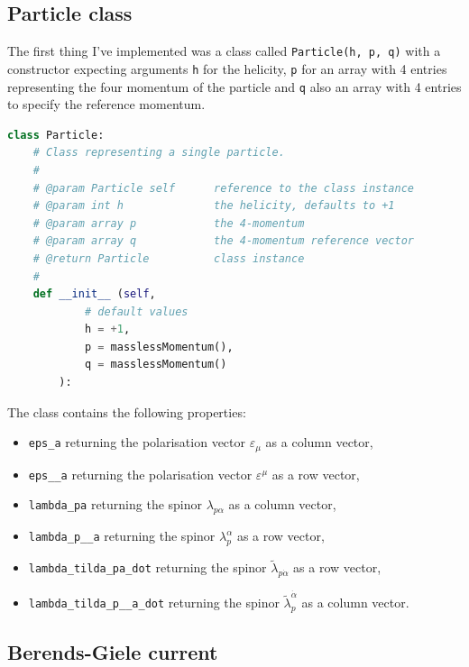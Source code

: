 \documentclass{article}
\theoremstyle{definition}
\def\code#1{\texttt{#1}}
\numberwithin{equation}{section}
\begin{document}
\subsection{Particle class}

The first thing I've implemented was a class called \code{Particle(h, p, q)} with a constructor expecting arguments \code{h} for the helicity, \code{p} for an array with 4 entries representing the four momentum of the particle and \code{q} also an array with 4 entries to specify the reference momentum.

\begin{lstlisting}[language=Python, caption=Particle class definiton]
class Particle:
    # Class representing a single particle.
    #
    # @param Particle self      reference to the class instance
    # @param int h              the helicity, defaults to +1
    # @param array p            the 4-momentum
    # @param array q            the 4-momentum reference vector
    # @return Particle          class instance
    #
    def __init__ (self,
            # default values
            h = +1,
            p = masslessMomentum(),
            q = masslessMomentum()
        ):
\end{lstlisting}

The class contains the following properties:

\begin{itemize}
  \item \code{eps\_a} returning the polarisation vector $\varepsilon_{\mu}$ as a column vector,
  \item \code{eps\_\_a} returning the polarisation vector $\varepsilon^{\mu}$ as a row vector,
  \item \code{lambda\_pa} returning the spinor $\lambda_{p \alpha}$ as a column vector,
  \item \code{lambda\_p\_\_a} returning the spinor $\lambda_p^{\alpha}$ as a row vector,
  \item \code{lambda\_tilda\_pa\_dot} returning the spinor $\tilde{\lambda}_{p \dot{\alpha}}$ as a row vector,
  \item \code{lambda\_tilda\_p\_\_a\_dot} returning the spinor $\tilde{\lambda}_{p}^{\dot{\alpha}}$ as a column vector.
\end{itemize}

\subsection{Berends-Giele current}
\end{document}
